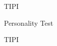 \begin{edXchapter}{TIPI}
\begin{edXsection}{Personality Test}
\begin{edXproblem}{TIPI}
\end{edXproblem}

\end{edXsection}
\end{edXchapter}

